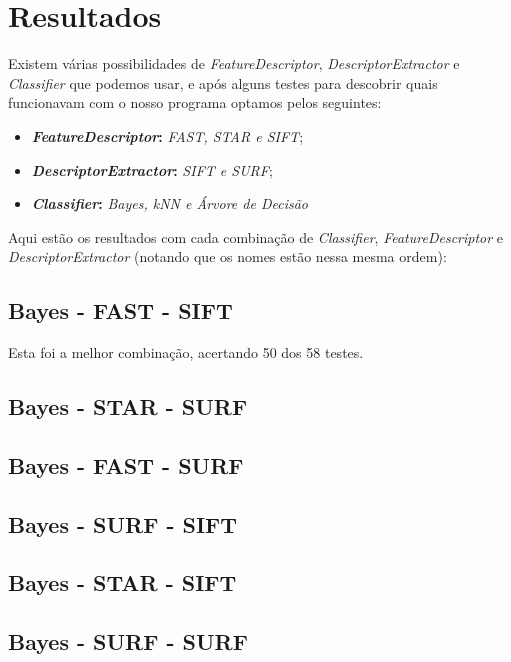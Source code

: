 \section{Resultados}
Existem várias possibilidades de \textit{FeatureDescriptor}, \textit{DescriptorExtractor} e
\textit{Classifier} que podemos usar, e após alguns testes para descobrir quais funcionavam com
o nosso programa optamos pelos seguintes:
\begin{itemize}
  \item \textbf{\textit{FeatureDescriptor}:} \textit{FAST, STAR e SIFT};
  \item \textbf{\textit{DescriptorExtractor}:} \textit{SIFT e SURF};
  \item \textbf{\textit{Classifier}:} \textit{Bayes, kNN e Árvore de Decisão}
\end{itemize}

Aqui estão os resultados com cada combinação de \textit{Classifier}, \textit{FeatureDescriptor} e
\textit{DescriptorExtractor} (notando que os nomes estão nessa mesma ordem):

\subsection{Bayes - FAST - SIFT}
Esta foi a melhor combinação, acertando 50 dos 58 testes.



\subsection{Bayes - STAR - SURF}


\subsection{Bayes - FAST - SURF}
  

\subsection{Bayes - SURF - SIFT}
 

\subsection{Bayes - STAR - SIFT}
  

\subsection{Bayes - SURF - SURF}
  

